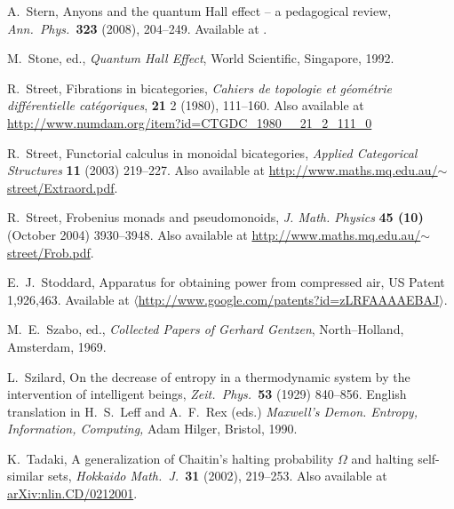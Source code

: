 \documentclass[12pt,twoside,openright]{report}
\begin{document}
\begin{thebibliography}{99}
 A.\ Stern, Anyons and the quantum Hall effect --
a pedagogical review, {\sl Ann.\ Phys.\ }{\bf 323} (2008), 204--249.  Available at .

 M.\ Stone, ed., {\sl Quantum Hall Effect}, World Scientific, Singapore, 1992.

 R.\ Street, Fibrations in bicategories, \textsl{Cahiers de topologie et g\'eom\'etrie diff\'erentielle cat\'egoriques}, 
\textbf{21} 2 (1980),  111--160.  Also available at \\ \href{http://www.numdam.org/item?id=CTGDC_1980__21_2_111_0}{http://www.numdam.org/item?id=CTGDC\_1980\_\_21\_2\_111\_0}

 R.\ Street, Functorial calculus in monoidal bicategories, \textsl{Applied Categorical Structures} \textbf{11} (2003) 219--227.  Also available at
\href{http://www.maths.mq.edu.au/~street/Extraord.pdf}{http://www.maths.mq.edu.au/$\sim$street/Extraord.pdf}.

 R.\ Street, Frobenius monads and pseudomonoids, \textsl{J. Math. Physics} \textbf{45 (10)} (October 2004) 3930--3948.  Also available at
\href{http://www.maths.mq.edu.au/~street/Frob.pdf}{http://www.maths.mq.edu.au/$\sim$street/Frob.pdf}.

 E.\ J.\ Stoddard, Apparatus for obtaining power from compressed air, US Patent 1,926,463.  Available at 
\hfill \break
\href{http://www.google.com/patents?id=zLRFAAAAEBAJ}
{$\langle$http://www.google.com/patents?id=zLRFAAAAEBAJ$\rangle$}.

 M.\ E.\ Szabo, ed., {\sl Collected Papers of Gerhard Gentzen}, North--Holland, Amsterdam, 1969.


 L.\ Szilard, On the decrease of entropy in a thermodynamic system by the intervention of intelligent beings,
\textsl{Zeit.\ Phys.\ }\textbf{53} (1929) 840--856. English translation in H.\ S.\ Leff and A.\ F.\ Rex (eds.)
\textit{Maxwell's Demon. Entropy, Information, Computing,} 
Adam Hilger, Bristol, 1990.

 K.\ Tadaki, A generalization of Chaitin's halting probability $\Omega$ and halting self-similar sets, {\sl Hokkaido Math.\ J.\ }\textbf{31} (2002), 219--253.  Also available at
\href{http://arxiv.org/abs/nlin.CD/0212001}{arXiv:nlin.CD/0212001}.


\end{thebibliography}
\end{document}

